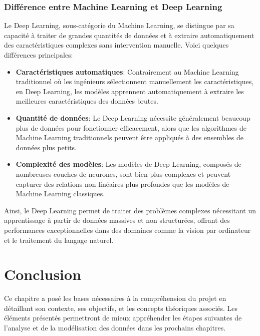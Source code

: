 \subsubsection{Différence entre Machine Learning et Deep Learning}

Le Deep Learning, sous-catégorie du Machine Learning, se distingue par sa capacité à traiter de grandes quantités de données et à extraire automatiquement des caractéristiques complexes sans intervention manuelle.
Voici quelques différences principales:
\begin{itemize}
    \item \textbf{Caractéristiques automatiques}: Contrairement au Machine Learning traditionnel où les ingénieurs sélectionnent manuellement les caractéristiques, en Deep Learning, les modèles apprennent automatiquement à extraire les meilleures caractéristiques des données brutes.
    \item \textbf{Quantité de données}: Le Deep Learning nécessite généralement beaucoup plus de données pour fonctionner efficacement, alors que les algorithmes de Machine Learning traditionnels peuvent être appliqués à des ensembles de données plus petits.
    \item \textbf{Complexité des modèles}: Les modèles de Deep Learning, composés de nombreuses couches de neurones, sont bien plus complexes et peuvent capturer des relations non linéaires plus profondes que les modèles de Machine Learning classiques.
\end{itemize}

Ainsi, le Deep Learning permet de traiter des problèmes complexes nécessitant un apprentissage à partir de données massives et non structurées, offrant des performances exceptionnelles dans des domaines comme la vision par ordinateur et le traitement du langage naturel.

\section{Conclusion}
Ce chapitre a posé les bases nécessaires à la compréhension du projet en détaillant son contexte, ses objectifs, et les concepts théoriques associés. Les éléments présentés permettront de mieux appréhender les étapes suivantes de l'analyse et de la modélisation des données dans les prochains chapitres.
